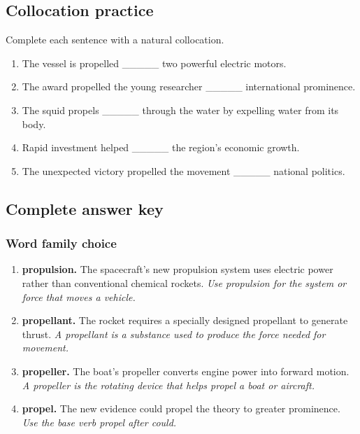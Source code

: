 \documentclass[11pt]{article}
\begin{document}
\subsection{Collocation practice}
Complete each sentence with a natural collocation.

\begin{enumerate}
  \item The vessel is propelled \_\_\_\_\_ two powerful electric motors.
  \item The award propelled the young researcher \_\_\_\_\_ international prominence.
  \item The squid propels \_\_\_\_\_ through the water by expelling water from its body.
  \item Rapid investment helped \_\_\_\_\_ the region's economic growth.
  \item The unexpected victory propelled the movement \_\_\_\_\_ national politics.
\end{enumerate}

\subsection{Complete answer key}
\subsubsection{Word family choice}
\begin{enumerate}
  \item \textbf{propulsion.} The spacecraft's new propulsion system uses electric power rather than conventional chemical rockets. \emph{Use propulsion for the system or force that moves a vehicle.}
  \item \textbf{propellant.} The rocket requires a specially designed propellant to generate thrust. \emph{A propellant is a substance used to produce the force needed for movement.}
  \item \textbf{propeller.} The boat's propeller converts engine power into forward motion. \emph{A propeller is the rotating device that helps propel a boat or aircraft.}
  \item \textbf{propel.} The new evidence could propel the theory to greater prominence. \emph{Use the base verb propel after could.}
\end{enumerate}
\end{document}
